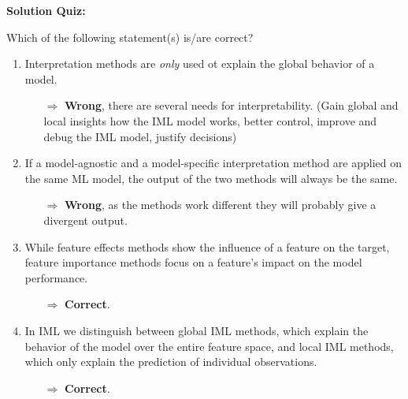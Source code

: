 \textbf{Solution Quiz:}\\\noindent
\medskip

Which of the following statement(s) is/are correct?  
	\begin{enumerate}
        \item Interpretation methods are \textit{only} used ot explain the global behavior of a model.
        \begin{itemize}
        	\item[$\Rightarrow$] \textbf{Wrong}, there are several needs for interpretability. (Gain global and local insights how the IML model works, better control, improve and debug the IML model, justify decisions)
        \end{itemize}
    	\item If a model-agnostic and a model-specific interpretation method are applied on the same ML model, the output of the two methods will always be the same.
    	\begin{itemize}
    		\item[$\Rightarrow$] \textbf{Wrong}, as the methods work different they will probably give a divergent output.
    	\end{itemize}
    	\item While feature effects methods show the influence of a feature on the target, feature importance methods focus on a feature's impact on the model performance.
    	\begin{itemize}
    		\item[$\Rightarrow$] \textbf{Correct}.
    	\end{itemize}
    	\item In IML we distinguish between global IML methods, which explain the behavior of the model over the entire feature space, and local IML methods, which only explain the prediction of individual observations. 
    	\begin{itemize}
    		\item[$\Rightarrow$] \textbf{Correct}.
    	\end{itemize}

\end{enumerate}
